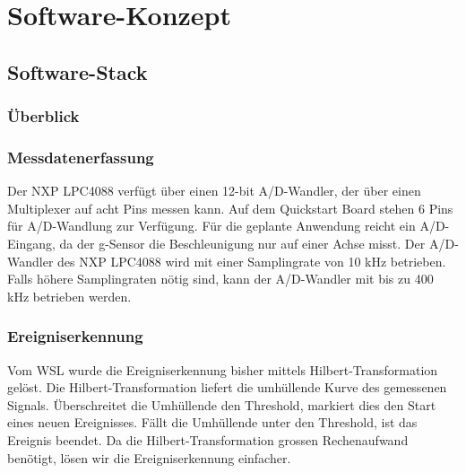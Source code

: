%
%

\chapter{Software-Konzept}\label{chap.software}


\section{Software-Stack}\label{sec.sw_stack}


\subsection{Überblick}\label{subsec.sw_ueberblick}


\subsection{Messdatenerfassung}\label{subsec.sw_messen}
Der NXP LPC4088 verfügt über einen 12-bit A/D-Wandler, der über einen Multiplexer auf acht Pins messen kann. Auf dem Quickstart Board stehen 6 Pins für A/D-Wandlung zur Verfügung. Für die geplante Anwendung reicht ein A/D-Eingang, da der g-Sensor die Beschleunigung nur auf einer Achse misst. Der A/D-Wandler des NXP LPC4088 wird mit einer Samplingrate von 10 kHz betrieben. Falls höhere Samplingraten nötig sind, kann der A/D-Wandler mit bis zu 400 kHz betrieben werden.



\subsection{Ereigniserkennung}\label{subsec.sw_ereignis}
Vom WSL wurde die Ereigniserkennung bisher mittels Hilbert-Transformation gelöst. Die Hilbert-Transformation liefert die umhüllende Kurve des gemessenen Signals. Überschreitet die Umhüllende den Threshold, markiert dies den Start eines neuen Ereignisses. Fällt die Umhüllende unter den Threshold, ist das Ereignis beendet. Da die Hilbert-Transformation grossen Rechenaufwand benötigt, lösen wir die Ereigniserkennung einfacher.

